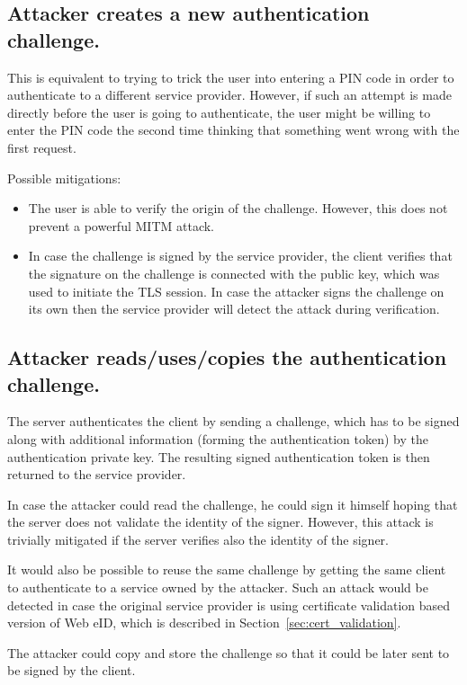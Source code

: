 \subsection{Attacker creates a new authentication challenge.}
\label{threat:create-authchallenge}
This is equivalent to trying to trick the user into entering a PIN code in order to authenticate to a different service provider. However, if such an attempt is made directly before the user is going to authenticate, the user might be willing to enter the PIN code the second time thinking that something went wrong with the first request. 

Possible mitigations:
\begin{itemize}
\item The user is able to verify the origin of the challenge. However, this does not prevent a powerful MITM attack.

\item In case the challenge is signed by the service provider, the client verifies that the signature on the challenge is connected with the public key, which was used to initiate the TLS session. In case the attacker signs the challenge on its own then the service provider will detect the attack during verification.
\end{itemize}


\subsection{Attacker reads/uses/copies the authentication challenge.}
\label{threat:read-authchallenge}
The server authenticates the client by sending a challenge, which has to be signed along with additional information (forming the authentication token) by the authentication private key. The resulting signed authentication token is then returned to the service provider.

In case the attacker could read the challenge, he could sign it himself hoping that the server does not validate the identity of the signer. However, this attack is trivially mitigated if the server verifies also the identity of the signer. 

It would also be possible to reuse the same challenge by getting the same client to authenticate to a service owned by the attacker. Such an attack would be detected in case the original service provider is using certificate validation based version of Web eID, which is described in Section~\ref{sec:cert_validation}. 

The attacker could copy and store the challenge so that it could be later sent to be signed by the client.


